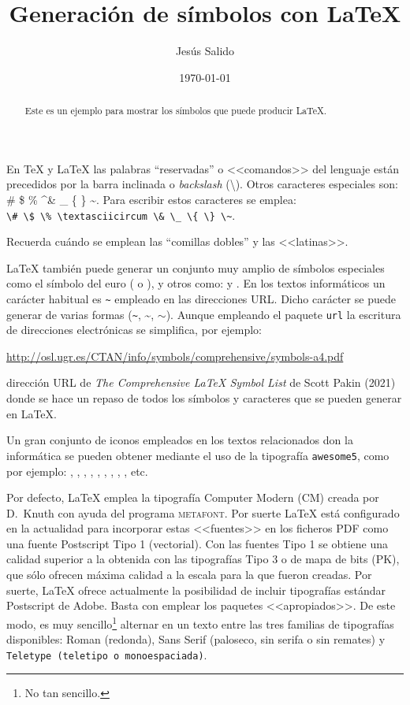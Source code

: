 \documentclass[11pt,a4paper]{article}
\title{Generación de símbolos con \LaTeX}
\author{Jesús Salido}
\date{\today}
\begin{document}
\maketitle


\begin{abstract}
	Este es un ejemplo para mostrar los símbolos que puede producir \LaTeX.
\end{abstract}



En \TeX{} y \LaTeX{} las palabras ``reservadas'' o <<comandos>> del lenguaje están precedidos por la barra inclinada o \emph{backslash} (\textbackslash). Otros caracteres especiales son: \# \$ \% \textasciicircum \& \_ \{ \} \~{}. Para escribir estos caracteres se emplea:\\
\verb!\# \$ \% \textasciicircum \& \_ \{ \} \~!.

Recuerda cuándo se emplean las ``comillas dobles'' y las <<latinas>>.

\LaTeX{} también puede generar un conjunto muy amplio de símbolos 
especiales como el símbolo del euro (\EUR{} o \texteuro), y otros como:  y \Coffeecup. En los 
textos informáticos un carácter habitual es \verb+~+ empleado en las 
direcciones URL. Dicho carácter se puede generar de varias formas (\verb+~+, 
\~{}, $\sim$). Aunque empleando el paquete \texttt{url} la escritura de 
direcciones electrónicas se simplifica, por ejemplo:

\url{http://osl.ugr.es/CTAN/info/symbols/comprehensive/symbols-a4.pdf}

\noindent dirección URL de \emph{The Comprehensive \LaTeX{} Symbol List} de Scott Pakin (2021) donde se hace un repaso de todos los símbolos y caracteres que se pueden generar en \LaTeX{}.

Un gran conjunto de iconos empleados en los textos relacionados don la informática se pueden 
obtener mediante el uso de la tipografía \texttt{awesome5}, como por 
ejemplo: \faNodeJs, \faNode, \faGooglePlay, \faInternetExplorer, \faGithub, 
\faGit*, \faWhatsapp, , , etc. 


Por defecto, \LaTeX{} emplea la tipografía Computer Modern (CM) creada por D.~Knuth con ayuda del programa \textsc{metafont}. Por suerte \LaTeX{} está configurado en la actualidad para incorporar estas <<fuentes>> en los ficheros PDF como una fuente Postscript Tipo 1 (vectorial). Con las fuentes Tipo 1 se obtiene una calidad superior a la obtenida con las tipografías Tipo 3 o de mapa de bits (PK), que sólo ofrecen máxima calidad a la escala para la que fueron creadas. Por suerte, \LaTeX{} ofrece actualmente la posibilidad de incluir tipografías estándar Postscript de Adobe. Basta con  emplear los paquetes <<apropiados>>. De este modo, es muy sencillo\footnote{No tan sencillo.} alternar en un texto entre las tres familias de tipografías disponibles: Roman (redonda), \textsf{Sans Serif (paloseco, sin serifa o sin remates)} y \texttt{Teletype (teletipo o monoespaciada)}.
\end{document}
